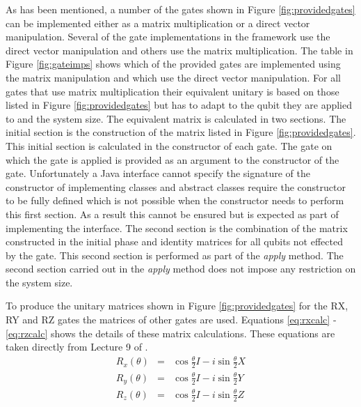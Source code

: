 As has been mentioned, a number of the gates shown in Figure \ref{fig:providedgates} can be implemented either as a matrix multiplication or a direct vector manipulation.
Several of the gate implementations in the framework use the direct vector manipulation and others use the matrix multiplication.
The table in Figure \ref{fig:gateimps} shows which of the provided gates are implemented using the matrix manipulation and which use the direct vector manipulation.
For all gates that use matrix multiplication their equivalent unitary is based on those listed in Figure \ref{fig:providedgates} but has to adapt to the qubit they are applied to and the system size.
The equivalent matrix is calculated in two sections.
The initial section is the construction of the matrix listed in Figure \ref{fig:providedgates}.
This initial section is calculated in the constructor of each gate.
The gate on which the gate is applied is provided as an argument to the constructor of the gate.
Unfortunately a Java interface cannot specify the signature of the constructor of implementing classes and abstract classes require the constructor to be fully defined which is not possible when the constructor needs to perform this first section.
As a result this cannot be ensured but is expected as part of implementing the interface.
The second section is the combination of the matrix constructed in the initial phase and identity matrices for all qubits not effected by the gate.
This second section is performed as part of the \emph{apply} method.
The second section carried out in the \emph{apply} method does not impose any restriction on the system size.

To produce the unitary matrices shown in Figure \ref{fig:providedgates} for the RX, RY and RZ gates the matrices of other gates are used.
Equations \ref{eq:rxcalc} - \ref{eq:rzcalc} shows the details of these matrix calculations.
These equations are taken directly from Lecture 9 of \cite{QIPLect}.
\begin{eqnarray}
\label{eq:rxcalc}
 R_x(\theta)&=&\cos{\frac{\theta}{2}}I-i\sin{\frac{\theta}{2}}X \\
\label{eq:rycalc}
 R_y(\theta)&=&\cos{\frac{\theta}{2}}I-i\sin{\frac{\theta}{2}}Y \\
\label{eq:rzcalc}
 R_z(\theta)&=&\cos{\frac{\theta}{2}}I-i\sin{\frac{\theta}{2}}Z 
\end{eqnarray}

